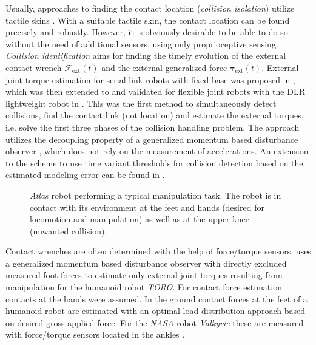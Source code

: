 Usually, approaches to finding the contact location (\emph{collision isolation}) utilize tactile skins \cite{DahiyaMitValChe2013,DeMaria201260,LumelskyChe1993,Strohmayr2012}. 
With a suitable tactile skin, the contact location can be found precisely and robustly. 
However, it is obviously desirable to be able to do so without the need of additional sensors, using only proprioceptive sensing. 
\emph{Collision identification} aims for finding the timely evolution of the external contact wrench $\bm{\mathcal{F}}_\mathrm{ext}(t)$ and the external generalized force $\bm{\tau}_\mathrm{ext}(t)$.
External joint torque estimation for serial link robots with fixed base was proposed in \cite{DeLucaMat2005}, which was then extended to and validated for flexible joint robots with the DLR lightweight robot in \cite{DeLucaAlbHadHir2006}.
This was the first method to simultaneously detect collisions, find the contact link (not location) and estimate the external torques, i.e. solve the first three phases of the collision handling problem.
The approach utilizes the decoupling property of a generalized momentum based disturbance observer \cite{DeLucaMat2003,KuntzeFreGieMil2003}, which does not rely on the measurement of accelerations.
An extension to the scheme to use time variant thresholds for collision detection based on the estimated modeling error can be found in \cite{SotoudehnejadKer2014,SotoudehnejadTakKerPol2012}.
%
\begin{figure}
\begin{center}
\graphicspath{{figures/atlas_box_strobo/}}

\end{center}
\vspace*{-0.2cm}
\caption{\emph{Atlas} robot performing a typical manipulation task. 
The robot is in contact with its environment at the feet and hands (desired for locomotion and manipulation) as well as at the upper knee (unwanted collision).}\vspace*{-0.7cm}
\label{fig:manip}
\end{figure}

Contact wrenches are often determined with the help of force/torque sensors. 
\cite{OttHenLee2013} uses a generalized momentum based disturbance observer with directly excluded measured foot forces to estimate only external joint torques resulting from manipulation for the humanoid robot \emph{TORO}. For contact force estimation contacts at the hands were assumed.
In \cite{HyonHalChe2007} the ground contact forces at the feet of a humanoid robot are estimated with an optimal load distribution approach based on desired gross applied force. For the \emph{NASA} robot \emph{Valkyrie} these are measured with force/torque sensors located in the ankles \cite{RadfordStrHamMeh2015}.


